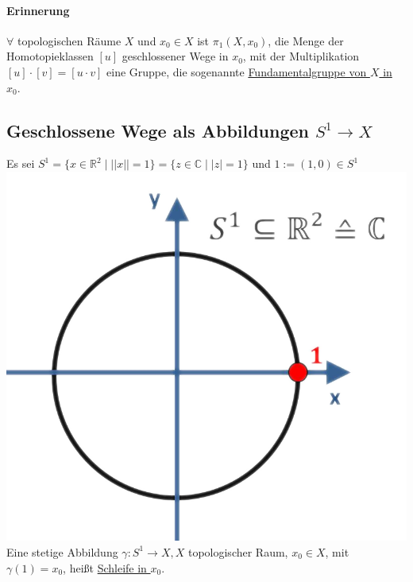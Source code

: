 \documentclass[a4paper,11pt,notitlepage]{report}
\theoremstyle{definition}
\newcommand{\R}{{\ensuremath{\mathbb{R}}}}
\newcommand{\C}{{\ensuremath{\mathbb{C}}}}
\newenvironment{definition}[1]{
	\begin{definitions}
	\marginnote{\emph{#1}}
}{\end{definitions}}
\begin{document}

\paragraph{Erinnerung} $\forall$ topologischen Räume $X$ und $x_0 \in X$ ist $\pi_1(X,x_0)$, die Menge der Homotopieklassen $[u]$ geschlossener Wege in $x_0$, mit der Multiplikation $[u] \cdot [v] = [u \cdot v]$ eine Gruppe, die sogenannte \underline{Fundamentalgruppe von $X$ in $x_0$}.
\newpage
\subsection{Geschlossene Wege als Abbildungen $S^1 \rightarrow X$}
\begin{definition}{Schleife}
	Es sei $S^1 = \{x \in \R^2 \mid ||x|| = 1\} = \{z \in \C \mid |z| = 1\}$
	und $1:= (1,0) \in S^1$ \newline \includegraphics[scale=0.3]{images/S1_mit_1.png}\newline
	Eine stetige Abbildung $\gamma \colon S^1 \rightarrow X, X$ topologischer Raum, $x_0 \in X$, mit $\gamma(1)=x_0$, heißt \underline{Schleife in $x_0$}.

\end{definition}
\end{document}
